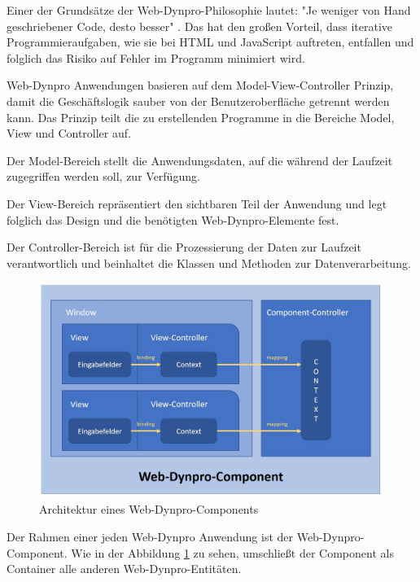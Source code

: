 Einer der Grundsätze der Web-Dynpro-Philosophie lautet: "Je weniger von Hand geschriebener Code, desto besser" \autocite[Vgl.][S.5]{NET310}. Das hat den großen Vorteil, dass iterative Programmieraufgaben, wie sie bei HTML und JavaScript auftreten, entfallen und folglich das Risiko auf Fehler im Programm minimiert wird.\autocite[Vgl.][S.2f]{NET310}

Web-Dynpro Anwendungen basieren auf dem Model-View-Controller Prinzip, damit die Geschäftslogik sauber von der Benutzeroberfläche getrennt werden kann. Das Prinzip teilt die zu erstellenden Programme in die Bereiche Model, View und Controller auf. \autocite[Vgl.][S.15]{NET310}

Der Model-Bereich stellt die Anwendungsdaten, auf die während der Laufzeit zugegriffen werden soll, zur Verfügung.\autocite[Vgl.][S.734]{KELLER2015}

Der View-Bereich repräsentiert den sichtbaren Teil der Anwendung und legt folglich das Design und die benötigten Web-Dynpro-Elemente fest.\autocite[Vgl.][S.15]{NET310}

Der Controller-Bereich ist für die Prozessierung der Daten zur Laufzeit verantwortlich und beinhaltet die Klassen und Methoden zur Datenverarbeitung.\autocite[Vgl.][S.734]{KELLER2015} 

\begin{figure}[h]
    \centering
    \includegraphics[width=1\textwidth]{img/WebDynpro_Componentselbst.JPG}
    \caption[Architektur eines Web-Dynpro-Components]{Architektur eines Web-Dynpro-Components\autocite[S.7]{NET310}}
    \label{fig:WebDynproComponent}
\end{figure}


Der Rahmen einer jeden Web-Dynpro Anwendung ist der Web-Dynpro-Component. Wie in der Abbildung \ref{fig:WebDynproComponent} zu sehen, umschließt der Component als Container alle anderen Web-Dynpro-Entitäten.

